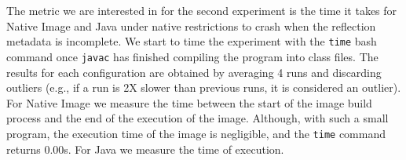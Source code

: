 
The metric we are interested in for the second experiment is the time it takes for Native Image and Java under native restrictions to crash when the reflection metadata is incomplete.
We start to time the experiment with the \verb|time| bash command once \verb|javac| has finished compiling the program into class files. 
The results for each configuration are obtained by averaging 4 runs and discarding outliers (e.g., if a run is 2X slower than previous runs, it is considered an outlier).
For Native Image we measure the time between the start of the image build process and the end of the execution of the image. Although, with such a small program, the execution time of the image is negligible, and the \verb|time| command returns 0.00s. For Java we measure the time of execution.

